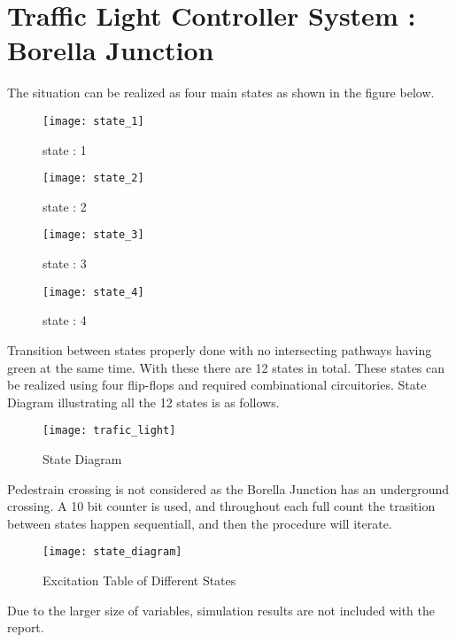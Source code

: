 \documentclass[11pt]{article}
\begin{document}
    \section{Traffic Light Controller System : Borella Junction}
    The situation can be realized as four main states as shown in the figure below.
    \begin{figure}[h]
        \begin{minipage}{.24\textwidth}
            \begin{center}
                \texttt{[image: state\_1]}
                \caption*{state : 1}
            \end{center}
        \end{minipage}
        \begin{minipage}{.24\textwidth}
            \begin{center}
                \texttt{[image: state\_2]}
                \caption*{state : 2}
            \end{center}
        \end{minipage}
        \begin{minipage}{.24\textwidth}
            \begin{center}
                \texttt{[image: state\_3]}
                \caption*{state : 3}
            \end{center}
        \end{minipage}
        \begin{minipage}{.24\textwidth}
            \begin{center}
                \texttt{[image: state\_4]}
                \caption*{state : 4}
            \end{center}
        \end{minipage}
    \end{figure}
    \newline
    Transition between states properly done with no intersecting pathways having green at the same time.
    With these there are 12 states in total. These states can be realized using four flip-flops and required
    combinational circuitories. State Diagram illustrating all the 12 states is as follows.
    \begin{figure}[h]
               \centering
               \texttt{[image: trafic\_light]}
        \caption*{State Diagram}
    \end{figure}

    \newline
    Pedestrain crossing is not considered as the Borella Junction has an underground crossing.
    A 10 bit counter is used, and throughout each full count the trasition between states happen sequentiall,
    and then the procedure will iterate.
    \newpage
    \begin{figure}[h]
        \centering
        \texttt{[image: state\_diagram]}
        \caption*{Excitation Table of Different States}
    \end{figure}
Due to the larger size of variables, simulation results are not included with the report.
    
\end{document}
